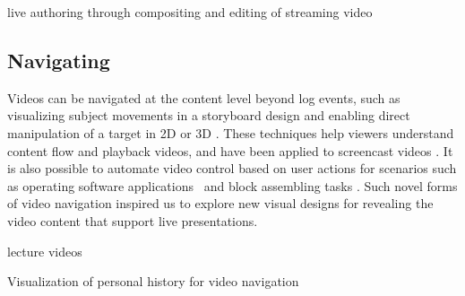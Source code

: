 live authoring through compositing and editing of streaming video~\cite{Freeman:2014:LLA:2611105.2557304}


\subsection{Navigating}
Videos can be navigated at the content level beyond log events, such as visualizing subject movements in a storyboard design \cite{goldman2006schematic} and enabling direct manipulation of a target in 2D \cite{Dragicevic:2008:VBD:1357054.1357096,Goldman:2008:VOA:1449715.1449719,Karrer:2008:DDM:1357054.1357097} or 3D \cite{Nguyen:2013:DMV:2470654.2466150}. These techniques help viewers understand content flow and playback videos, and have been applied to screencast videos \cite{Denoue:2013:RDM:2451176.2451190}. It is also possible to automate video control based on user actions for scenarios such as operating software applications~\cite{Pongnumkul:2011ju} and block assembling tasks \cite{Gupta:2012ku}. Such novel forms of video navigation inspired us to explore new visual designs for revealing the video content that support live presentations.

lecture videos~\cite{Tang:2006:DIU:1111449.1111523}

Visualization of personal history for video navigation~\cite{Al-Hajri:2014:VPH:2611105.2557106}

